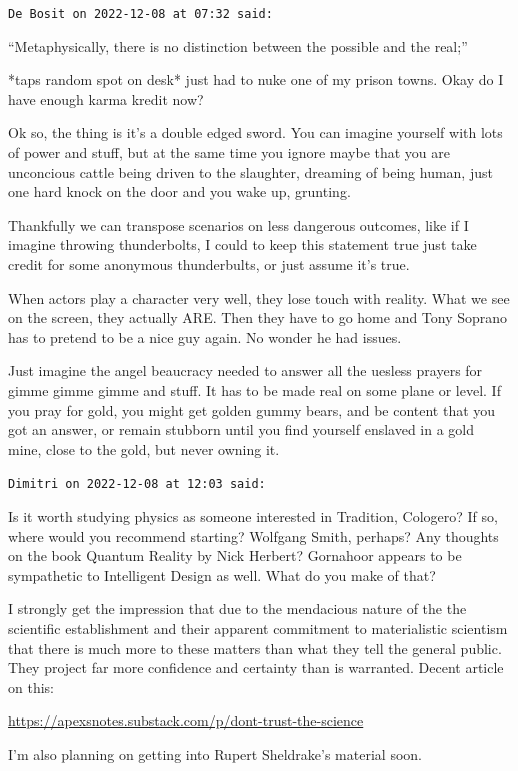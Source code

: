 \begin{footnotesize}
\begin{sffamily}
\hfill

\texttt{De Bosit on 2022-12-08 at 07:32 said:}

``Metaphysically, there is no distinction between the possible and the real;''

*taps random spot on desk* just had to nuke one of my prison towns. Okay do I have enough karma kredit now?

Ok so, the thing is it's a double edged sword. You can imagine yourself with lots of power and stuff, but at the same time you ignore maybe that you are unconcious cattle being driven to the slaughter, dreaming of being human, just one hard knock on the door and you wake up, grunting.

Thankfully we can transpose scenarios on less dangerous outcomes, like if I imagine throwing thunderbolts, I could to keep this statement true just take credit for some anonymous thunderbults, or just assume it's true.

When actors play a character very well, they lose touch with reality. What we see on the screen, they actually ARE. Then they have to go home and Tony Soprano has to pretend to be a nice guy again. No wonder he had issues.

Just imagine the angel beaucracy needed to answer all the uesless prayers for gimme gimme gimme and stuff. It has to be made real on some plane or level. If you pray for gold, you might get golden gummy bears, and be content that you got an answer, or remain stubborn until you find yourself enslaved in a gold mine, close to the gold, but never owning it.

\hfill

\texttt{Dimitri on 2022-12-08 at 12:03 said:}

Is it worth studying physics as someone interested in Tradition, Cologero? If so, where would you recommend starting? Wolfgang Smith, perhaps? Any thoughts on the book Quantum Reality by Nick Herbert? Gornahoor appears to be sympathetic to Intelligent Design as well. What do you make of that?

I strongly get the impression that due to the mendacious nature of the the scientific establishment and their apparent commitment to materialistic scientism that there is much more to these matters than what they tell the general public. They project far more confidence and certainty than is warranted. Decent article on this:

\url{https://apexsnotes.substack.com/p/dont-trust-the-science}

I'm also planning on getting into Rupert Sheldrake's material soon.


\end{sffamily}
\end{footnotesize}
